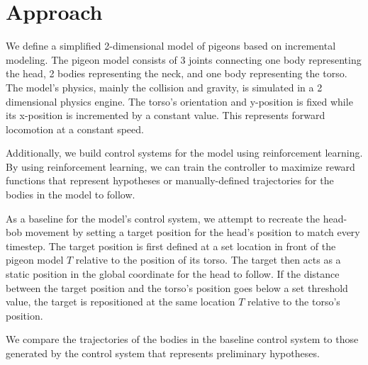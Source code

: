 \chapter{Approach}
  We define a simplified 2-dimensional model of pigeons based on incremental modeling. The pigeon model consists of 3 joints connecting one body representing the head, 2 bodies representing the neck, and one body representing the torso. The model's physics, mainly the collision and gravity, is simulated in a 2 dimensional physics engine. The torso's orientation and y-position is fixed while its x-position is incremented by a constant value. This represents forward locomotion at a constant speed.

  Additionally, we build control systems for the model using reinforcement learning. By using reinforcement learning, we can train the controller to maximize reward functions that represent hypotheses or manually-defined trajectories for the bodies in the model to follow.

  As a baseline for the model's control system, we attempt to recreate the head-bob movement by setting a target position for the head's position to match every timestep. The target position is first defined at a set location in front of the pigeon model $T$ relative to the position of its torso. The target then acts as a static position in the global coordinate for the head to follow. If the distance between the target position and the torso's position goes below a set threshold value, the target is repositioned at the same location $T$ relative to the torso's position.

  We compare the trajectories of the bodies in the baseline control system to those generated by the control system that represents preliminary hypotheses.


